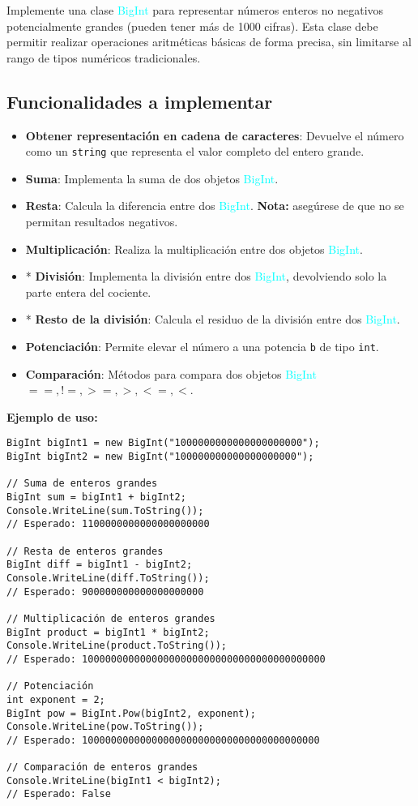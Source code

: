 Implemente una clase \textcolor{cyan}{BigInt} para representar números enteros no negativos potencialmente grandes (pueden tener más de 1000 cifras). Esta clase debe permitir realizar operaciones aritméticas básicas de forma precisa, sin limitarse al rango de tipos numéricos tradicionales.

\subsection*{Funcionalidades a implementar}
\begin{itemize}
    \item \textbf{Obtener representación en cadena de caracteres}: Devuelve el número como un \texttt{string} que representa el valor completo del entero grande.
    \item \textbf{Suma}: Implementa la suma de dos objetos \textcolor{cyan}{BigInt}.
    \item \textbf{Resta}: Calcula la diferencia entre dos \textcolor{cyan}{BigInt}. \textbf{Nota:} asegúrese de que no se permitan resultados negativos.
    \item \textbf{Multiplicación}: Realiza la multiplicación entre dos objetos \textcolor{cyan}{BigInt}.
    \item * \textbf{División}: Implementa la división entre dos \textcolor{cyan}{BigInt}, devolviendo solo la parte entera del cociente.
    \item * \textbf{Resto de la división}: Calcula el residuo de la división entre dos \textcolor{cyan}{BigInt}.
    \item \textbf{Potenciación}: Permite elevar el número a una potencia \texttt{b} de tipo \texttt{int}.
    \item \textbf{Comparación}: Métodos para compara dos objetos \textcolor{cyan}{BigInt} $==, !=, >=, >, <=, <$.
\end{itemize}

\textbf{Ejemplo de uso:}
\begin{lstlisting}
BigInt bigInt1 = new BigInt("1000000000000000000000");
BigInt bigInt2 = new BigInt("100000000000000000000");

// Suma de enteros grandes
BigInt sum = bigInt1 + bigInt2;
Console.WriteLine(sum.ToString());
// Esperado: 1100000000000000000000

// Resta de enteros grandes
BigInt diff = bigInt1 - bigInt2;
Console.WriteLine(diff.ToString());
// Esperado: 900000000000000000000

// Multiplicación de enteros grandes
BigInt product = bigInt1 * bigInt2;
Console.WriteLine(product.ToString());
// Esperado: 100000000000000000000000000000000000000000

// Potenciación
int exponent = 2;
BigInt pow = BigInt.Pow(bigInt2, exponent);
Console.WriteLine(pow.ToString());
// Esperado: 10000000000000000000000000000000000000000

// Comparación de enteros grandes
Console.WriteLine(bigInt1 < bigInt2);
// Esperado: False
\end{lstlisting}